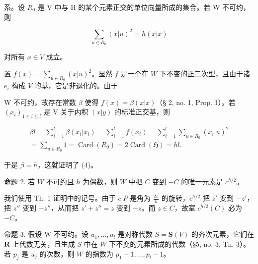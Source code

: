 系。设 \(R_{0}\) 是 V 中与 H 的某个元素正交的单位向量所成的集合。若 W 不可约，则

\[
\sum_ {u \in R _ {0}} (x | u) ^ {2} = h (x | x)\tag{4}
\]

对所有 \(x \in V\) 成立。

置 \(f(x) = \sum_{u \in R_0} (x|u)^2\)。显然 \(f\) 是一个在 \(W\) 下不变的正二次型，且由于诸 \(e_i\) 构成 \(V\) 的基，它是非退化的。由于

W 不可约，故存在常数 \(\beta\) 使得 \(f(x) = \beta (x|x)\)（§ 2, no. 1, Prop. 1）。若 \((x_{i})_{1\leqslant i\leqslant l}\) 是 V 关于内积 \((x|y)\) 的标准正交基，则

\[
\begin{array}{l} \beta l = \sum_ {i = 1} ^ {l} \beta (x _ {i} | x _ {i}) = \sum_ {i = 1} ^ {l} f (x _ {i}) = \sum_ {i = 1} ^ {l} \sum_ {u \in R _ {0}} (x _ {i} | u) ^ {2} \\ = \sum_ {u \in R _ {0}} 1 = \operatorname{Card} (R _ {0}) = 2 \operatorname{Card} (\mathfrak {H}) = h l. \end{array}
\]

于是 \(\beta = h\)，这就证明了 (4)。

命题 2. 若 \(W\) 不可约且 \(h\) 为偶数，则 \(W\) 中把 \(C\) 变到 \(-C\) 的唯一元素是 \(c^{h/2}\)。

我们使用 Th. 1 证明中的记号。由于 \(c|P\) 是角为 \(\frac{2\pi}{h}\) 的旋转，\(c^{h/2}\) 把 \(z'\) 变到 \(-z'\)，把 \(z''\) 变到 \(-z''\)，从而把 \(z' + z'' = z\) 变到 \(-z\)。而 \(z \in C\)，故室 \(c^{h/2}(C)\) 必为 \(-C\)。

命题 3. 假设 W 不可约。设 \(u_1, \ldots, u_l\) 是对称代数 \(S = \mathbf{S}(V)\) 的齐次元素，它们在 \(\mathbf{R}\) 上代数无关，且生成 \(S\) 中在 \(W\) 下不变的元素所成的代数（§5, no. 3, Th. 3）。若 \(p_j\) 是 \(u_j\) 的次数，则 \(W\) 的指数为 \(p_1 - 1, \ldots, p_l - 1\)。

